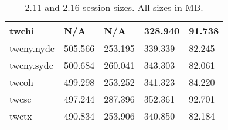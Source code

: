 \documentclass{article}
\begin{document}
\begin{table}[H]
\begin{tabular}{|l|l|l|l|l|}
\hline twchi & N/A & N/A & 328.940 & 91.738 \\
\hline twcny.nydc & 505.566 & 253.195 & 339.339 & 82.245 \\
\hline twcny.sydc & 500.684 & 260.041 & 343.303 & 82.061 \\
\hline twcoh & 499.298 & 253.252 & 341.323 & 84.220 \\
\hline twcsc & 497.244 & 287.396 & 352.361 & 92.701 \\
\hline twctx & 490.834 & 253.906 & 340.850 & 82.184 \\
\hline
\end{tabular}
\caption{\label{TABLE-SessionSizeTotals}2.11 and 2.16 session sizes. All sizes in MB.} 
\end{table}
\end{document}
